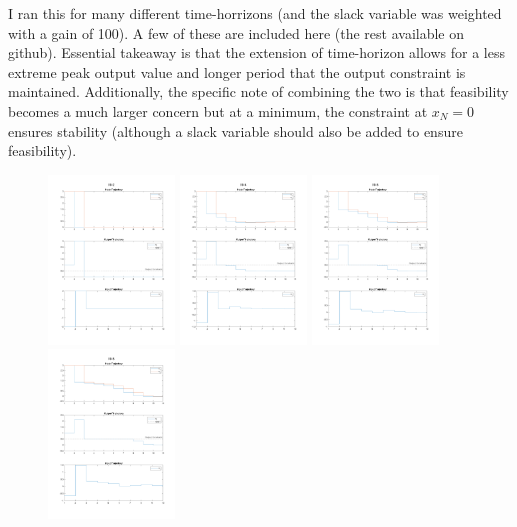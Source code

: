 \documentclass[]{article}
\begin{document}
I ran this for many different time-horrizons (and the slack variable was weighted with a gain of 100).
A few of these are included here (the rest available on github).
Essential takeaway is that the extension of time-horizon allows for a less extreme peak output value and longer period that the output constraint is maintained.
Additionally, the specific note of combining the two is that feasibility becomes a much larger concern but at a minimum, the constraint at $x_N = 0$ ensures stability (although a slack variable should also be added to ensure feasibility).

\begin{figure}[h]
    \centering
    \includegraphics[width=0.3\textwidth]{figs/pblm1d_N=2.png}
    \includegraphics[width=0.3\textwidth]{figs/pblm1d_N=4.png}
    \includegraphics[width=0.3\textwidth]{figs/pblm1d_N=6.png}
    \includegraphics[width=0.3\textwidth]{figs/pblm1d_N=8.png}

\end{figure}
\end{document}

